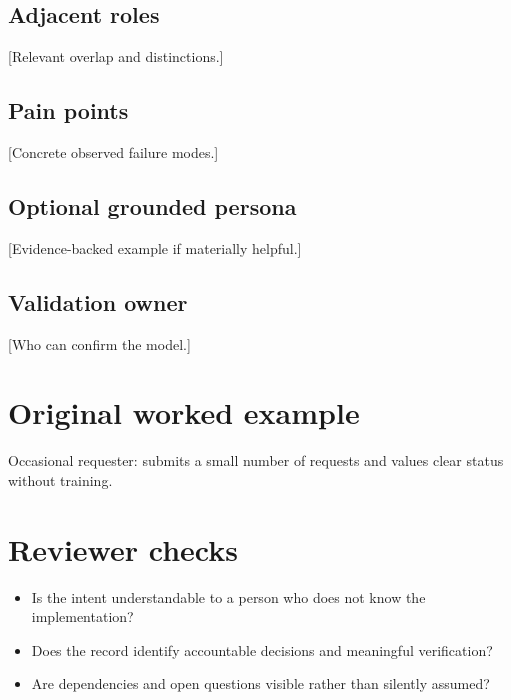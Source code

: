 \documentclass[11pt,letterpaper]{article}
\begin{document}
\subsection{Adjacent roles}
[Relevant overlap and distinctions.]

\subsection{Pain points}
[Concrete observed failure modes.]

\subsection{Optional grounded persona}
[Evidence-backed example if materially helpful.]

\subsection{Validation owner}
[Who can confirm the model.]

\section{Original worked example}
\begin{tcolorbox}[colback=tealback,colframe=navy,title={Illustrative entry},breakable]
Occasional requester: submits a small number of requests and values clear status without training.

\end{tcolorbox}
\section{Reviewer checks}
\begin{itemize}[leftmargin=*,itemsep=2pt]
\item Is the intent understandable to a person who does not know the implementation?
\item Does the record identify accountable decisions and meaningful verification?
\item Are dependencies and open questions visible rather than silently assumed?
\end{itemize}
\end{document}
